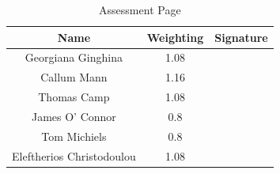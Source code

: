 \documentclass[11pt,a4paper]{article}
\begin{document}
\pagebreak

\begin{table}
\caption{Assessment Page}
\centering
\begin{tabular}{c c c}
\hline\hline
Name & Weighting & Signature\\ [0.5ex]
\hline
Georgiana Ginghina & 1.08 & \\
Callum Mann & 1.16 & \\
Thomas Camp & 1.08 & \\
James O' Connor & 0.8 & \\
Tom Michiels & 0.8 & \\
Eleftherios Christodoulou & 1.08 & \\

\end{tabular}	
\end{table}
\end{document}
